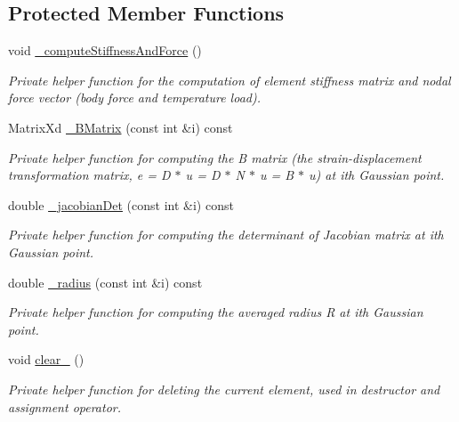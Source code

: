 \subsection*{Protected Member Functions}
\begin{DoxyCompactItemize}
\item 
\mbox{\label{class_element_a72e74815f04f26994013ceef6b089bc0}} 
void \mbox{\hyperlink{class_element_a72e74815f04f26994013ceef6b089bc0}{\+\_\+compute\+Stiffness\+And\+Force}} ()
\begin{DoxyCompactList}\small\item\em Private helper function for the computation of element stiffness matrix and nodal force vector (body force and temperature load). \end{DoxyCompactList}\item 
Matrix\+Xd \mbox{\hyperlink{class_element_a6995ea43beef7872e1ca864b9cc6e46b}{\+\_\+\+B\+Matrix}} (const int \&i) const
\begin{DoxyCompactList}\small\item\em Private helper function for computing the B matrix (the strain-\/displacement transformation matrix, e = D $\ast$ u = D $\ast$ N $\ast$ u = B $\ast$ u) at ith Gaussian point. \end{DoxyCompactList}\item 
double \mbox{\hyperlink{class_element_a3ac0c5f98e318c8cbd331f1ea06cf43d}{\+\_\+jacobian\+Det}} (const int \&i) const
\begin{DoxyCompactList}\small\item\em Private helper function for computing the determinant of Jacobian matrix at ith Gaussian point. \end{DoxyCompactList}\item 
double \mbox{\hyperlink{class_element_a9bc684fa8143312e39e3ff59e1cc2e32}{\+\_\+radius}} (const int \&i) const
\begin{DoxyCompactList}\small\item\em Private helper function for computing the averaged radius R at ith Gaussian point. \end{DoxyCompactList}\item 
\mbox{\label{class_element_abaf9d2954fb21056ab93b3c1b9a3afe2}} 
void \mbox{\hyperlink{class_element_abaf9d2954fb21056ab93b3c1b9a3afe2}{clear\+\_\+}} ()
\begin{DoxyCompactList}\small\item\em Private helper function for deleting the current element, used in destructor and assignment operator. \end{DoxyCompactList}\item 

\end{DoxyCompactItemize}
